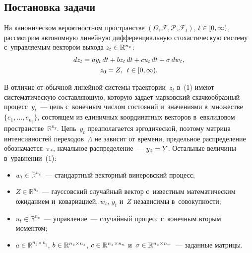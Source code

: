\begin{multicols}{2}
\vspace*{-4pt}
     
\section{Постановка задачи}

     На каноническом вероятностном пространстве $(\Omega, 
\mathcal{F},\mathcal{P}, \mathcal{F}_t)$, $t\hm\in [0,\infty)$, рассмотрим 
автономную линейную дифференциальную стохастическую сис\-те\-му 
с~управ\-ля\-емым вектором выхода $z_t \hm\in \mathbb{R}^{n_z}$:
     \begin{multline}
     dz_t= ay_t\,dt+bz_t\,dt+cu_t\,dt+\sigma \,dw_t,\\ z_0=Z,\enskip t\in [0,\infty).
     \label{e1-bos}
     \end{multline}
      
      В отличие от обычной линейной системы траектории~$z_t$ в~(1) 
имеют систематическую со\-став\-ля\-ющую, которую задает марковский 
скачкообразный процесс~$y_t$~--- цепь с~конечным числом \mbox{состояний} 
и~значениями в~множестве $\{ e_1, \ldots, e_{n_y}\}$, состоящем из 
единичных координатных векторов в~евклидовом 
пространстве~$\mathbb{R}^{n_y}$. Цепь~$y_t$ предполагается 
эргодической, поэтому матрица интенсивностей переходов~$\Lambda$ не 
зависит от времени, предельное распределение обозначается~$\pi_*$, 
начальное распределение~--- $y_0\hm=Y$. Остальные величины 
в~уравнении~(1):
      \begin{itemize}
        \item $w_t\in \mathbb{R}^{n_w}$~--- стандартный векторный винеровский процесс;
        \item $Z\in \mathbb{R}^{n_z}$~--- гауссовский случайный вектор с~известным 
математическим ожиданием и~ковариацией, $w_t$, $y_t$ и~$Z$ независимы в~совокупности;
        \item $u_t\in\mathbb{R}^{n_u}$~--- управление~--- случайный процесс с~конечным 
вторым моментом;
        \item $a\in \mathbb{R}^{n_z\times n_y}$, $b\hm\in \mathbb{R}^{n_z\times n_z}$, $c\hm\in 
\mathbb{R}^{n_z\times n_u}$ и~$\sigma\hm\in \mathbb{R}^{n_z\times n_w}$~--- заданные 
матрицы.
\end{itemize}
     

\end{multicols}

